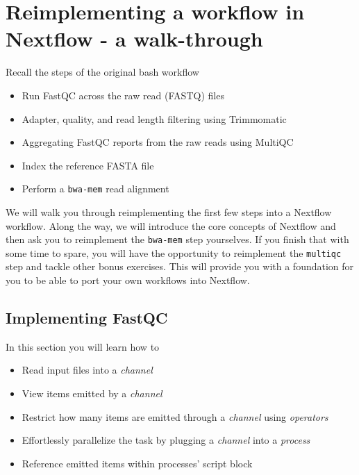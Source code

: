 
\section{Reimplementing a workflow in Nextflow - a walk-through}

Recall the steps of the original bash workflow

\begin{itemize}
  \item Run FastQC across the raw read (FASTQ) files
  \item Adapter, quality, and read length filtering using Trimmomatic
  \item Aggregating FastQC reports from the raw reads using MultiQC
  \item Index the reference FASTA file
  \item Perform a \texttt{bwa-mem} read alignment
\end{itemize}

We will walk you through reimplementing the first few steps 
into a Nextflow workflow. Along the way, we will introduce the core concepts of Nextflow 
and then ask you to reimplement the \texttt{bwa-mem} step yourselves. 
If you finish that with some time to spare, you will have the opportunity to reimplement the \texttt{multiqc} step and tackle other bonus exercises. 
This will provide you with a foundation for you to be able to port your own workflows into Nextflow. 



\subsection{Implementing FastQC}

In this section you will learn how to 

\begin{itemize}
 \item Read input files into a \emph{channel}
 \item View items emitted by a \emph{channel}
 \item Restrict how many items are emitted through a \emph{channel} using \emph{operators}
 \item Effortlessly parallelize the task by plugging a \emph{channel} into a \emph{process}
 \item Reference emitted items within processes' script block
\end{itemize}

